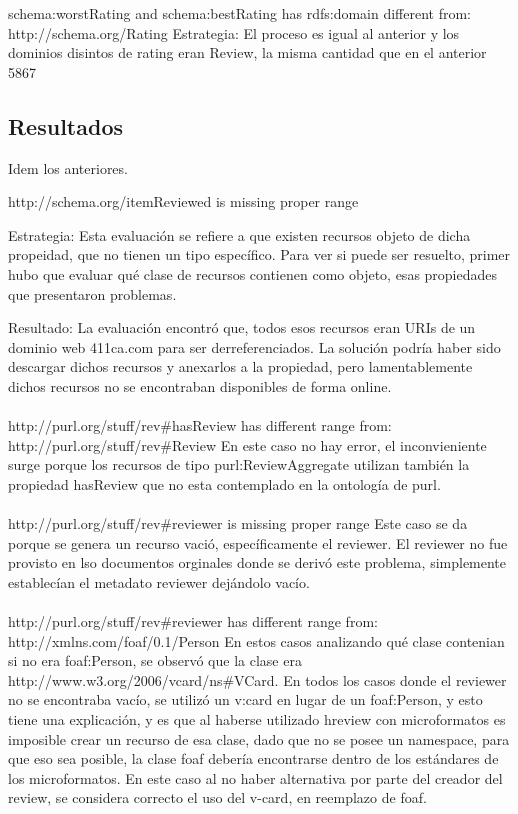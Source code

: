 schema:worstRating and schema:bestRating has rdfs:domain different from: http://schema.org/Rating
Estrategia:
El proceso es igual al anterior y los dominios disintos de rating eran Review, la misma cantidad que en el anterior 5867

\subsection*{Resultados}
Idem los anteriores.

http://schema.org/itemReviewed is missing proper range

Estrategia:
Esta evaluación se refiere a que existen recursos objeto de dicha propeidad, que no tienen un tipo específico. Para ver si 
puede ser resuelto, primer hubo que evaluar qué clase de recursos contienen como objeto, esas propiedades que presentaron problemas.

Resultado:
La evaluación encontró que, todos esos recursos eran URIs de un dominio web 411ca.com para ser derreferenciados. La solución podría haber sido 
descargar dichos recursos y anexarlos a la propiedad, pero lamentablemente dichos recursos no se encontraban disponibles de forma online.
\\\\
http://purl.org/stuff/rev\#hasReview has different range from:\\\noindent http://purl.org/stuff/rev\#Review 
En este caso no hay error, el inconvieniente surge porque los recursos de tipo purl:ReviewAggregate utilizan también la propiedad hasReview
que no esta contemplado en la ontología de purl.
\\\\
http://purl.org/stuff/rev\#reviewer is missing proper range
Este caso se da \\\noindent porque se genera un recurso vació, específicamente el reviewer. El reviewer no fue provisto en lso documentos orginales donde 
se derivó este problema, simplemente establecían el metadato reviewer dejándolo vacío.
\\\\
http://purl.org/stuff/rev\#reviewer has different range from:\\\noindent http://xmlns.com/foaf/0.1/Person
En estos casos analizando qué clase contenian si no era foaf:Person, se observó que la clase era \\\noindent http://www.w3.org/2006/vcard/ns\#VCard.
En todos los casos donde el reviewer no se encontraba vacío, se utilizó un v:card en lugar de un foaf:Person, y esto tiene una explicación, 
y es que al haberse utilizado hreview con microformatos es imposible crear un recurso de esa clase, dado que no se posee un namespace, para que 
eso sea posible, la clase foaf debería encontrarse dentro de los estándares de los microformatos. 
En este caso al no haber alternativa por parte del creador del review, se considera correcto el uso del v-card, en reemplazo de foaf.

